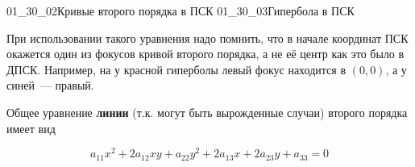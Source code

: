 \gallerydouble
  {01_30_02}{Кривые второго порядка в ПСК}
  {01_30_03}{Гипербола в ПСК}

\begin{remark}
  При использовании такого уравнения надо помнить, что в начале координат ПСК
  окажется один из фокусов кривой второго порядка, а не её центр как это было в
  ДПСК. Например, на  у красной гиперболы левый фокус находится
  в \((0, 0)\), а у синей~--- правый.
\end{remark}

\begin{remark}
  Общее уравнение \textbf{линии} (т.к. могут быть вырожденные случаи) второго
  порядка имеет вид  

  \begin{equation*}
    a_{11} x^2 + 2 a_{12} xy + a_{22} y^2 + 2 a_{13} x + 2 a_{23} y + a_{33} = 0
  \end{equation*}
\end{remark}

